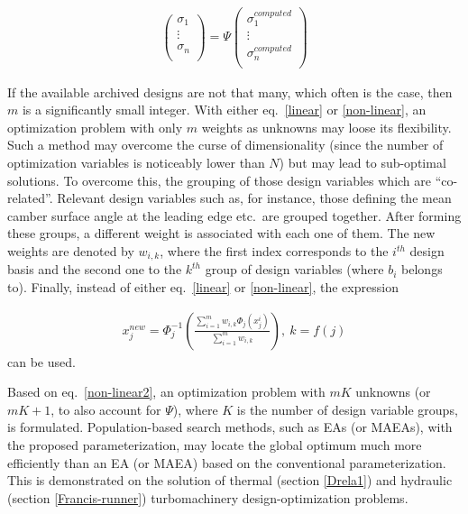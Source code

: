 \begin{eqnarray}
		\left( {\begin{array}{c}
 		\sigma _1  \\
 		\vdots  \\
 		\sigma _n  \\
 		\end{array} } \right) =
 		\Psi  
 		\left( {\begin{array}{c}
 		\sigma _1^{computed}  \\
 		\vdots  \\
 		\sigma _n^{computed}  \\
 		\end{array} } \right)
   \label{cdf-matrix} 
\end{eqnarray}


If the available archived designs are not that many, which often is the case, then $m$ is a significantly small integer.  With either eq.\ \ref{linear} or \ref{non-linear}, an optimization problem with only $m$ weights as unknowns may loose its flexibility. Such a method may overcome the curse of dimensionality (since the number of optimization variables is  noticeably lower than $N$) but may lead to sub-optimal solutions. To overcome this, the grouping of those design variables which are ``co-related''. Relevant design variables such as, for instance, those defining the mean camber surface angle at the leading edge etc.\ are grouped together. After forming these groups, a different weight is associated with each one of them. The new weights are denoted by $w_{i,k}$, where the first index corresponds to the $i^{th}$ design basis and the second one to the $k^{th}$ group of design variables (where $b_i$ belongs to). Finally, instead of either eq.\ \ref{linear} or \ref{non-linear}, the expression


\begin{eqnarray}
   x_j^{new} = \Phi _j^{-1} (\frac{\sum_{i=1}^{m}w_{i,k} \Phi _j(x_j^i)}{\sum_{i=1}^{m}w_{i,k} }),~ k=f(j) 
   \label{non-linear2} 
\end{eqnarray}
can be used. 

Based on eq.\ \ref{non-linear2}, an optimization problem with $m  K$ unknowns (or $m K\!+\!1$, to also account for $\Psi$), where $K$ is the number of design variable groups, is formulated. Population-based search methods, such as EAs (or MAEAs), with the proposed parameterization, may locate the global optimum much more efficiently than an EA (or MAEA) based on the conventional parameterization. This is demonstrated on the solution of  thermal (section \ref{Drela1}) and hydraulic (section \ref{Francis-runner}) turbomachinery design-optimization problems. 


